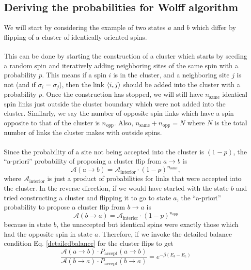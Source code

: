 \documentclass[../journal_main.tex]{subfiles}
\begin{document}
\subsection{Deriving the probabilities for Wolff algorithm}
We will start by considering the example of two states $a$ and $b$ which differ by flipping of a cluster of identically oriented spins.~\\~\\
This can be done by starting the construction of a cluster which starts by seeding a random spin and iteratively adding neighboring sites of the same spin with a probability $p$. This means if a spin $i$ is in the cluster, and a neighboring site $j$ is not (and if $\sigma_i = \sigma_j$), then the link $\expval{i,j}$ should be added into the cluster with a probability $p$. Once the construction has stopped, we will still have $n_\text{same}$ identical spin links just outside the cluster boundary which were not added into the cluster. Similarly, we say the number of opposite spin links which have a spin opposite to that of the cluster is $n_\text{opp}$. Also, $n_\text{same} + n_\text{opp} = N$ where $N$ is the total number of links the cluster makes with outside spins.~\\~\\  
Since the probability of a site not being accepted into the cluster is $(1-p)$, the ``a-priori'' probability of proposing a cluster flip from $a \to b$ is 
\begin{equation}
    \mathcal{A}(a \to b) = \mathcal{A}_\text{interior} \cdot (1-p)^{n_\text{same}},
\end{equation}
where $\mathcal{A}_\text{interior}$ is just a product of probabilities for links that were accepted into the cluster. In the reverse direction, if we would have started with the state $b$ and tried constructing a cluster and flipping it to go to state $a$, the ``a-priori'' probability to propose a cluster flip from $b \to a$ is 
\begin{equation}
    \mathcal{A}(b \to a) = \mathcal{A}_\text{interior} \cdot (1-p)^{n_\text{opp}}
\end{equation}
because in state $b$, the unaccepted but identical spins were exactly those which had the opposite spin in state $a$. Therefore, if we invoke the detailed balance condition Eq. \eqref{detailedbalance} for the cluster flips to get
\begin{equation}
    \frac{\mathcal{A}(a \to b) \cdot P_\text{accept}(a \to b)}{\mathcal{A}(b \to a) \cdot P_\text{accept}(b \to a)} = e^{-\beta(E_b - E_a)}
\end{equation}
\end{document}
